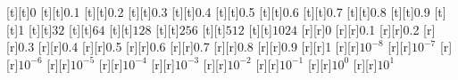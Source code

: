 \begin{psfrags}
%
[t][t]{0}%
[t][t]{0.1}%
[t][t]{0.2}%
[t][t]{0.3}%
[t][t]{0.4}%
[t][t]{0.5}%
[t][t]{0.6}%
[t][t]{0.7}%
[t][t]{0.8}%
[t][t]{0.9}%
[t][t]{1}%
[t][t]{${32}$}%
[t][t]{${64}$}%
[t][t]{${128}$}%
[t][t]{${256}$}%
[t][t]{${512}$}%
[t][t]{${1024}$}%
%
[r][r]{0}%
[r][r]{0.1}%
[r][r]{0.2}%
[r][r]{0.3}%
[r][r]{0.4}%
[r][r]{0.5}%
[r][r]{0.6}%
[r][r]{0.7}%
[r][r]{0.8}%
[r][r]{0.9}%
[r][r]{1}%
[r][r]{$10^{-8}$}%
[r][r]{$10^{-7}$}%
[r][r]{$10^{-6}$}%
[r][r]{$10^{-5}$}%
[r][r]{$10^{-4}$}%
[r][r]{$10^{-3}$}%
[r][r]{$10^{-2}$}%
[r][r]{$10^{-1}$}%
[r][r]{$10^{0}$}%
[r][r]{$10^{1}$}%
%
%
\end{psfrags}%
%
